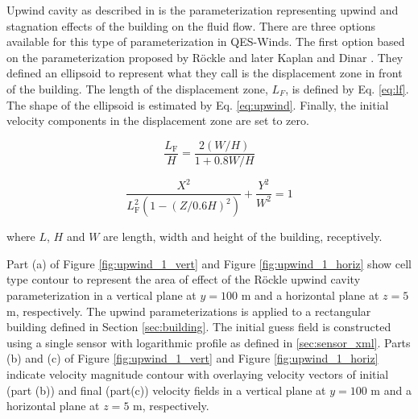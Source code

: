Upwind cavity as described in \cite{nelson20085,bagal2004improved, gowardhan2010evaluation} is the parameterization representing upwind and stagnation effects of the building on the fluid flow. There are three options available for this type of parameterization in QES-Winds. The first option based on the parameterization proposed by R\"{o}ckle \cite{rockle1990bestimmung} and later Kaplan and Dinar \cite{kaplan1996lagrangian}. They defined an ellipsoid to represent what they call is the displacement zone in front of the building. The length of the displacement zone, $L_F$, is defined by Eq. \ref{eq:lf}. The shape of the ellipsoid is estimated by Eq. \ref{eq:upwind}. Finally, the initial velocity components in the displacement zone are set to zero.

\begin{equation}
\frac{L_{\mathrm{F}}}{H}=\frac{2(W / H)}{1+0.8 W / H}
\label{eq:lf}
\end{equation}

\begin{equation}
\frac{X^{2}}{L_{\mathrm{F}}^{2}\left(1-(Z / 0.6 H)^{2}\right)}+\frac{Y^{2}}{W^{2}}=1
\label{eq:upwind}
\end{equation}

where $L$, $H$ and $W$ are length, width and height of the building, receptively.

Part (a) of Figure \ref{fig:upwind_1_vert} and Figure \ref{fig:upwind_1_horiz} show cell type contour to represent the area of effect of the R\"{o}ckle upwind cavity parameterization in a vertical plane at $y=100$ m and a horizontal plane at $z=5$ m, respectively. The upwind parameterizations is applied to a rectangular building defined in Section \ref{sec:building}. The initial guess field is constructed using a single sensor with logarithmic profile as defined in \ref{sec:sensor_xml}. Parts (b) and (c) of Figure \ref{fig:upwind_1_vert} and Figure \ref{fig:upwind_1_horiz} indicate velocity magnitude contour with overlaying velocity vectors of initial (part (b)) and final (part(c)) velocity fields in a vertical plane at $y=100$ m and a horizontal plane at $z=5$ m, respectively.

